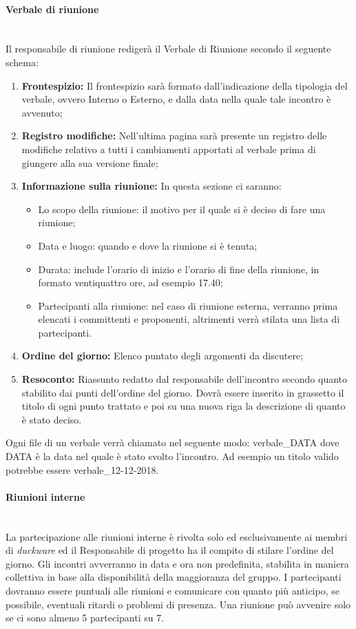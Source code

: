\paragraph{Verbale di riunione}\mbox{}\\[0.4cm]
Il responsabile di riunione redigerà il Verbale di Riunione secondo il seguente schema:
\begin{enumerate}
    \item \textbf{Frontespizio: }Il frontespizio sarà formato dall’indicazione della tipologia del verbale, ovvero Interno o Esterno, e dalla data nella quale tale incontro è avvenuto;
    \item \textbf{Registro modifiche: }Nell'ultima pagina sarà presente un registro delle modifiche relativo a tutti i cambiamenti apportati al verbale prima di giungere alla sua versione finale;
    \item \textbf{Informazione sulla riunione: }In questa sezione ci saranno:
    \begin{itemize}
        \item Lo scopo della riunione: il motivo per il quale si è deciso di fare una riunione;
        \item Data e luogo: quando e dove la riunione si è tenuta;
        \item Durata: include l’orario di inizio e l’orario di fine della riunione, in formato ventiquattro ore, ad esempio 17.40;
        \item Partecipanti alla riunione: nel caso di riunione esterna, verranno prima elencati i committenti e proponenti, altrimenti verrà stilata una lista di partecipanti.
    \end{itemize}
    \item \textbf{Ordine del giorno: }Elenco puntato degli argomenti da discutere;
    \item \textbf{Resoconto: }Riassunto redatto dal responsabile dell’incontro secondo quanto stabilito dai punti dell'ordine del giorno. Dovrà essere inserito in grassetto il titolo di ogni punto trattato e poi su una nuova riga la descrizione di quanto è stato deciso.
\end{enumerate}
Ogni file di un verbale verrà chiamato nel seguente modo: verbale\_{}DATA dove DATA è la data nel quale è stato svolto l'incontro. Ad esempio un titolo valido potrebbe essere verbale\_{}12-12-2018.

\paragraph{Riunioni interne}\mbox{}\\[0.4cm]
La partecipazione alle riunioni interne è rivolta solo ed esclusivamente ai membri di \emph{duckware} ed il Responsabile di progetto ha il compito di stilare l’ordine del giorno. Gli incontri avverranno in data e ora non predefinita, stabilita in maniera collettiva in base alla disponibilità della maggioranza del gruppo. I partecipanti dovranno essere puntuali alle riunioni e comunicare con quanto più anticipo, se possibile, eventuali ritardi o problemi di presenza. Una riunione può avvenire solo se ci sono almeno 5 partecipanti su 7.

